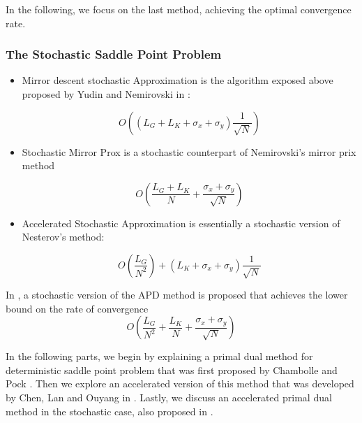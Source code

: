 \documentclass[12pt,reqno]{amsart}
\numberwithin{equation}{section}
\begin{document}
In the following, we focus on the last method, achieving the optimal convergence rate.

%

\subsubsection{The Stochastic Saddle Point Problem}\label{sec:stochastic_spp}
\begin{itemize}
\item Mirror descent stochastic Approximation is the algorithm exposed above proposed by Yudin and Nemirovski in \cite{YudinNemirovski}:

$$
O((L_{G} + L_{K} + \sigma_{x} + \sigma_{y})\dfrac{1}{\sqrt{N}})
$$

\item Stochastic Mirror Prox is a stochastic counterpart of Nemirovski's mirror prix method

$$
O(\dfrac{L_{G} + L_{K}}{N} + \dfrac{\sigma_{x} + \sigma_{y}}{\sqrt{N}})
$$

\item Accelerated Stochastic Approximation is essentially a stochastic version of Nesterov's method:

$$
O(\dfrac{L_{G}}{N^{2}}) + (L_{K} + \sigma_{x} + \sigma_{y})\dfrac{1}{\sqrt{N}}
$$
\end{itemize}

In \cite{ChenLanOuyang}, a stochastic version of the APD method is proposed that achieves the lower bound on the rate 
of convergence
$$
O(\dfrac{L_{G}}{N^{2}} + \dfrac{L_{K}}{N} + \dfrac{\sigma_{x} + \sigma_{y}}{\sqrt{N}})
$$

In the following parts, we begin by explaining a primal dual method for deterministic saddle point problem that was first proposed by 
Chambolle and Pock \cite{ChambollePock}. Then we explore an accelerated version of this method that was developed by Chen, Lan and Ouyang in \cite{ChenLanOuyang}.
Lastly, we discuss an accelerated primal dual method in the stochastic case, also proposed in \cite{ChenLanOuyang}.
\end{document}

